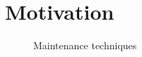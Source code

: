 \section{Motivation}
\label{sec:motivation}

\begin{figure}[htbp]
    \centering
    
    \caption{Maintenance techniques}
    \label{fig:maintthechniques}
\end{figure}